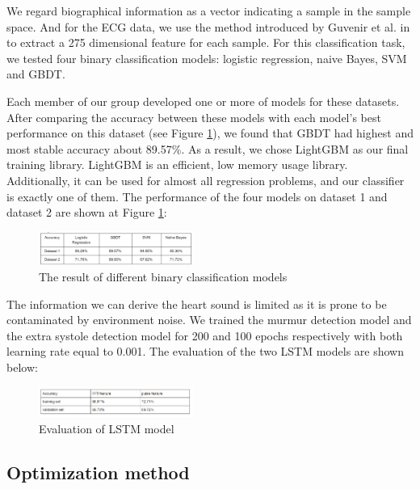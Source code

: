 \documentclass[letterpaper]{article} %
\begin{document}
We regard biographical information as a vector indicating a sample in the sample space. And for the ECG data, we use the method introduced by Guvenir et al. in \cite{guvenir1997supervised} to extract a 275 dimensional feature for each sample.  For this classification task, we tested four binary classification models: logistic regression, naive Bayes, SVM and GBDT. 

Each member of our group developed one or more of models for these datasets. After comparing the accuracy between these models with each model's best performance on this dataset (see Figure \ref{fig:dataset-1-comparison}), we found that GBDT had highest and most stable accuracy about 89.57\%. As a result, we chose LightGBM as our final training library. LightGBM is an efficient, low memory usage library. Additionally, it can be used for almost all regression problems, and our classifier is exactly one of them. The performance of the four models on dataset 1 and dataset 2 are shown at Figure \ref{fig:dataset-1-comparison}:

\begin{figure}[!htbp]
\centering\includegraphics[width=0.45\textwidth]{dataset-1-comparison}
\caption{The result of different binary classification models}
\label{fig:dataset-1-comparison}
\end{figure}

The information we can derive the heart sound is limited as it is prone to be contaminated by environment noise. We trained the murmur detection model and the extra systole detection model for 200 and 100 epochs respectively with both learning rate equal to 0.001. The evaluation of the two LSTM models are shown below:

\begin{figure}[!htbp]
\centering\includegraphics[width=0.45\textwidth]{dataset-3-comparison}
\caption{Evaluation of LSTM model}
\label{fig:dataset-3-comparison}
\end{figure}

\subsection{Optimization method}
\end{document}
